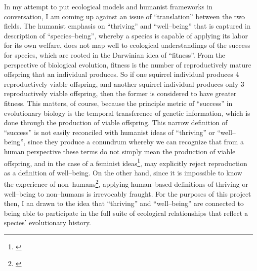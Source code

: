 \documentclass{article}
\begin{document}
{In my attempt to put ecological models and humanist frameworks in conversation, I am coming up against an issue of ``translation'' between the two fields. The humanist emphasis on ``thriving'' and ``well--being'' that is captured in \citeauthor{fair_toward_2023} description of ``species--being'', whereby a species is capable of applying its labor for its own welfare, does not map well to ecological understandings of the success for species, which are rooted in the Darwinian idea of ``fitness''. From the perspective of biological evolution, fitness is the number of reproductively mature offspring that an individual produces. So if one squirrel individual produces 4 reproductively viable offspring, and another squirrel individual produces only 3 reproductively viable offspring, then the former is considered to have greater fitness. This matters, of course, because the principle metric of ``success'' in evolutionary biology is the temporal transference of genetic information, which is done through the production of viable offspring. This narrow definition of ``success'' is not easily reconciled with humanist ideas of ``thriving'' or ``well--being'', since they produce a conundrum whereby we can recognize that from a human perspective these terms do not simply mean the production of viable offspring, and in the case of a feminist ideas\footnote{\cite{}}, may explicitly reject reproduction as a definition of well--being. On the other hand, since it is impossible to know the experience of non--humans\footnote{\cite{fair_toward_2023}}, applying human--based definitions of thriving or well--being to non--humans is irrevocably fraught. For the purposes of this project then, I an drawn to the idea that ``thriving'' and ``well--being'' are connected to being able to participate in the full suite of ecological relationships that reflect a species' evolutionary history. 

}
\end{document}
